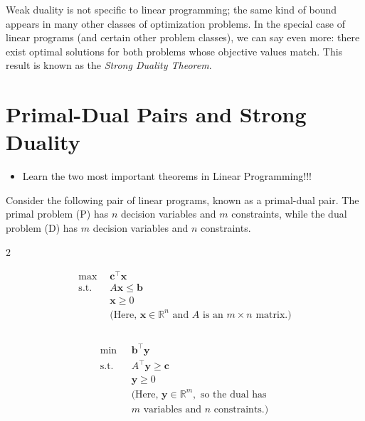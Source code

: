 Weak duality is not specific to linear programming; the same kind of bound appears in many other classes of optimization problems. In the special case of linear programs (and certain other problem classes), we can say even more: there exist optimal solutions for both problems whose objective values match. This result is known as the \emph{Strong Duality Theorem}.

\section{Primal-Dual Pairs and Strong Duality}
\label{sec:duality-strong}
\begin{outcome}
\begin{itemize}
\item Learn the two most important theorems in Linear Programming!!!
\end{itemize}
\end{outcome}
Consider the following pair of linear programs, known as a primal-dual pair. The primal problem (P) has $n$ decision variables and $m$ constraints, while the dual problem (D) has $m$ decision variables and $n$ constraints.
\begin{multicols}{2}
\begin{tcolorbox}[title=Primal (P), colback=blue!5, colframe=blue!60!black, sharp corners=south]
\[
\begin{aligned}
\max\ & \mathbf{c}^\top \mathbf{x} \\
\text{s.t.} \quad & A \mathbf{x} \leq \mathbf{b} \\
& \mathbf{x} \geq 0 \\
& \text{(Here, } \mathbf{x} \in \mathbb{R}^n \text{ and } A \text{ is an } m \times n \text{ matrix.)}
\\
\phantom{} \\
\end{aligned}
\]
\end{tcolorbox}

\columnbreak

\begin{tcolorbox}[title=Dual (D), colback=green!5, colframe=green!60!black, sharp corners=south]
\[
\begin{aligned}
\min\ & \mathbf{b}^\top \mathbf{y} \\
\text{s.t.} \quad & A^\top \mathbf{y} \geq \mathbf{c} \\
& \mathbf{y} \geq 0 \\
& \text{(Here, } \mathbf{y} \in \mathbb{R}^m, \text{ so the dual has } \\
& m \text{ variables and } n \text{ constraints.)}
\end{aligned}
\]
\end{tcolorbox}
\end{multicols}

